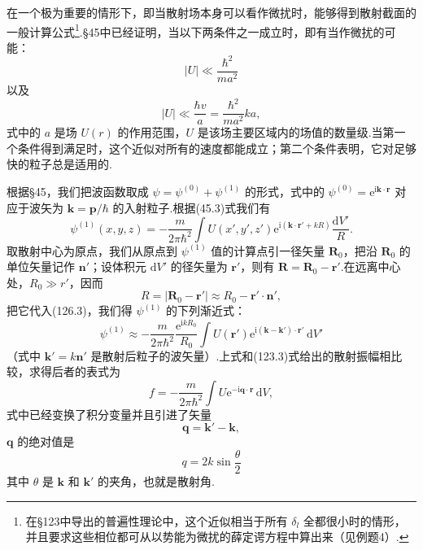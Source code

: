 在一个极为重要的情形下，即当散射场本身可以看作微扰时，能够得到散射截面的一般计算公式\footnote{在§123中导出的普遍性理论中，这个近似相当于所有 $\delta_l$ 全都很小时的情形，并且要求这些相位都可从以势能为微扰的薛定谔方程中算出来（见例题4）.}.§45中已经证明，当以下两条件之一成立时，即有当作微扰的可能：
\begin{equation}
  |U|\ll\frac{\hbar^2}{ma^2}
\end{equation}
以及
\begin{equation}
  |U|\ll\frac{\hbar v}{a}=\frac{\hbar^2}{ma^2}ka,
\end{equation}
式中的 $a$ 是场 $U(r)$ 的作用范围，$U$ 是该场主要区域内的场值的数量级.当第一个条件得到满足时，这个近似对所有的速度都能成立；第二个条件表明，它对足够快的粒子总是适用的.

根据§45，我们把波函数取成 $\psi=\psi^{(0)}+\psi^{(1)}$ 的形式，式中的
$\psi^{(0)}=\mathrm{e}^{\mathrm{i}\boldsymbol{k}\cdot\boldsymbol{r}}$
对应于波矢为 $\boldsymbol{k}=\boldsymbol{p}/\hbar$ 的入射粒子.根据(45.3)式我们有
\begin{equation}
  \psi^{(1)}(x,y,z)=-\frac{m}{2\pi\hbar^2}
  \int U(x',y',z')\mathrm{e}^{\mathrm{i}(\boldsymbol{k}\cdot\boldsymbol{r}'+kR)}
  \frac{\mathrm{d}V'}{R}.
\end{equation}
取散射中心为原点，我们从原点到 $\psi^{(1)}$ 值的计算点引一径矢量 $\boldsymbol{R}_0$，把沿 $\boldsymbol{R}_0$ 的单位矢量记作 $\boldsymbol{n}'$；设体积元 $\mathrm{d}V'$ 的径矢量为 $\boldsymbol{r}'$，则有 $\boldsymbol{R}=\boldsymbol{R}_0-\boldsymbol{r}'$.在远离中心处，$R_0\gg r'$，因而
\begin{equation*}
  R=|\boldsymbol{R}_0-\boldsymbol{r}'|
  \approx R_0-\boldsymbol{r}'\cdot\boldsymbol{n}',
\end{equation*}
把它代入(126.3)，我们得 $\psi^{(1)}$ 的下列渐近式：
\begin{equation*}
  \psi^{(1)}\approx-\frac{m}{2\pi\hbar^2}
  \frac{\mathrm{e}^{\mathrm{i}kR_0}}{R_0}
  \int U(\boldsymbol{r}')
  \mathrm{e}^{\mathrm{i}(\boldsymbol{k}-\boldsymbol{k}')\cdot\boldsymbol{r}'}
  \,\mathrm{d}V'
\end{equation*}
（式中 $\boldsymbol{k}'=k\boldsymbol{n}'$ 是散射后粒子的波矢量）.上式和(123.3)式给出的散射振幅相比较，求得后者的表式为
\begin{equation}
  f=-\frac{m}{2\pi\hbar^2}
  \int U\mathrm{e}^{-\mathrm{i}\boldsymbol{q}\cdot\boldsymbol{r}}\,\mathrm{d}V,
\end{equation}
式中已经变换了积分变量并且引进了矢量
\begin{equation}
  \boldsymbol{q}=\boldsymbol{k}'-\boldsymbol{k},
\end{equation}
$\boldsymbol{q}$ 的绝对值是
\begin{equation}
  q=2k\sin\frac{\theta}{2}
\end{equation}
其中 $\theta$ 是 $\boldsymbol{k}$ 和 $\boldsymbol{k}'$ 的夹角，也就是散射角.

